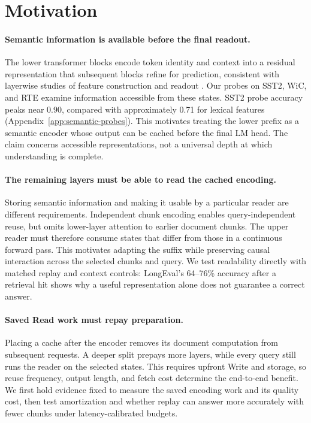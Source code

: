 \section{Motivation}
\label{sec:motivation}
\paragraph{Semantic information is available before the final readout.}
The lower transformer blocks encode token identity and context into a residual representation that subsequent blocks refine for prediction, consistent with layerwise studies of feature construction and readout \citep{stagesofinference}. Our probes on SST2, WiC, and RTE examine information accessible from these states. SST2 probe accuracy peaks near 0.90, compared with approximately 0.71 for lexical features (Appendix~\ref{app:semantic-probes}). This motivates treating the lower prefix as a semantic encoder whose output can be cached before the final LM head. The claim concerns accessible representations, not a universal depth at which understanding is complete.

\paragraph{The remaining layers must be able to read the cached encoding.}
Storing semantic information and making it usable by a particular reader are different requirements. Independent chunk encoding enables query-independent reuse, but omits lower-layer attention to earlier document chunks. The upper reader must therefore consume states that differ from those in a continuous forward pass. This motivates adapting the suffix while preserving causal interaction across the selected chunks and query. We test readability directly with matched replay and context controls: LongEval's 64--76\% accuracy after a retrieval hit shows why a useful representation alone does not guarantee a correct answer.

\paragraph{Saved Read work must repay preparation.}
Placing a cache after the encoder removes its document computation from subsequent requests. A deeper split prepays more layers, while every query still runs the reader on the selected states. This requires upfront Write and storage, so reuse frequency, output length, and fetch cost determine the end-to-end benefit. We first hold evidence fixed to measure the saved encoding work and its quality cost, then test amortization and whether replay can answer more accurately with fewer chunks under latency-calibrated budgets.
